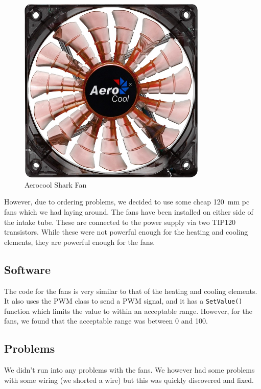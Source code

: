 \documentclass[a4paper,oneside]{book}
\begin{document}
\begin{figure}[h]
\centering
\includegraphics[width=0.8\textwidth]{images/fan.jpg}
\caption{Aerocool Shark Fan \protect\cite{aerocool}}
\label{fig:fan}
\end{figure}

However, due to ordering problems, we decided to use some cheap \SI{120}{\mm}
pc fans which we had laying around. The fans have been installed on either side
of the intake tube. These are connected to the power supply via two TIP120
transistors. While these were not powerful enough for the heating and cooling
elements, they are powerful enough for the fans.

\subsection{Software}
The code for the fans is very similar to that of the heating and cooling
elements. It also uses the PWM class to send a PWM signal, and it has a
\lstinline|SetValue()| function which limits the value to within an acceptable
range.  However, for the fans, we found that the acceptable range was between 0
and 100.



\subsection{Problems}
We didn't run into any problems with the fans. We however had some problems
with some wiring (we shorted a wire) but this was quickly discovered and fixed.
\end{document}
